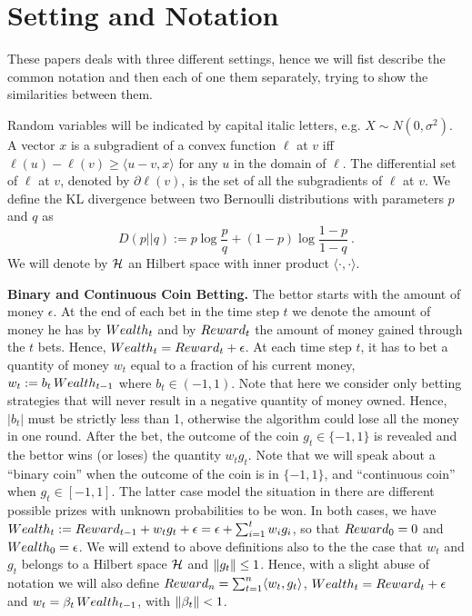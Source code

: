 \section{Setting and Notation}
These papers deals with three different settings, hence we will fist describe the common notation and then each of one them separately, trying to show the similarities between them.

Random variables will be indicated by capital italic letters, e.g. $X \sim N(0,\sigma^2)$.
A vector $x$ is a subgradient of a convex function $\ell$ at $v$ iff $\ell(u) - \ell(v) \ge \langle u - v, x \rangle$ for any $u$ in the domain of $\ell$. The differential set of $\ell$ at $v$, denoted by $\partial \ell(v)$, is the set of all the subgradients of $\ell$ at $v$.
We define the KL divergence between two Bernoulli distributions with parameters $p$ and $q$ as
\[
D(p||q) := p \log\frac{p}{q} + (1-p) \log\frac{1-p}{1-q}~.
\]
We will denote by $\mathcal{H}$ an Hilbert space with inner product $\langle \cdot, \cdot\rangle$.

\vspace{0.2cm}\noindent\textbf{Binary and Continuous Coin Betting.}
The bettor starts with the amount of money $\epsilon$. 
At the end of each bet in the time step $t$ we denote the amount of money he has by $Wealth_t$ and by $Reward_t$ the amount of money gained through the $t$ bets. Hence, $Wealth_t=Reward_t+\epsilon$.
At each time step $t$, it has to bet a quantity of money $w_t$ equal to a fraction of his current money, $w_t:=b_t \, Wealth_{t-1}$ where $b_t \in (-1,1)$. Note that here we consider only betting strategies that will never result in a negative quantity of money owned. Hence, $|b_t|$ must be strictly less than 1, otherwise the algorithm could lose all the money in one round.
After the bet, the outcome of the coin $g_t \in \{-1,1\}$ is revealed and the bettor wins (or loses) the quantity $w_t g_t$.
Note that we will speak about a ``binary coin'' when the outcome of the coin is in $\{-1,1\}$, and ``continuous coin'' when $g_t \in [-1,1]$. The latter case model the situation in there are different possible prizes with unknown probabilities to be won. In both cases, we have $Wealth_t:=Reward_{t-1} + w_t g_t + \epsilon= \epsilon + \sum_{i=1}^t w_i g_i$, so that $Reward_0=0$ and $Wealth_0=\epsilon$.
We will extend to above definitions also to the the case that $w_t$ and $g_t$ belongs to a Hilbert space $\mathcal{H}$ and $\left\|{g_t}\right\|\leq 1$. Hence, with a slight abuse of notation we will also define $Reward_n=\sum_{t=1}^n \langle w_t, g_t \rangle$, $Wealth_t=Reward_t + \epsilon$ and $w_t = \beta_t \, Wealth_{t-1}$, with $\left\|{\beta_t}\right\| < 1$.


